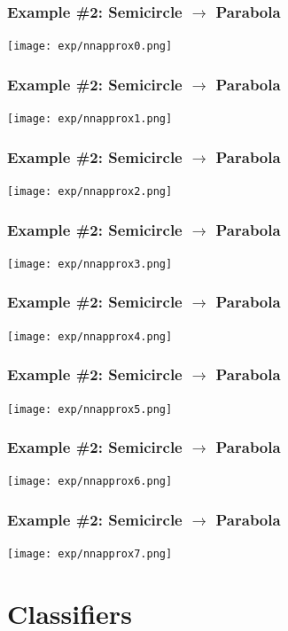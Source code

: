 \documentclass{beamer}
\begin{document}
\begin{frame}
  \frametitle{Example \#2: Semicircle $\rightarrow$ Parabola}

  \texttt{[image: exp/nnapprox0.png]}
\end{frame}

\begin{frame}
  \frametitle{Example \#2: Semicircle $\rightarrow$ Parabola}

  \texttt{[image: exp/nnapprox1.png]}
\end{frame}

\begin{frame}
  \frametitle{Example \#2: Semicircle $\rightarrow$ Parabola}

  \texttt{[image: exp/nnapprox2.png]}
\end{frame}

\begin{frame}
  \frametitle{Example \#2: Semicircle $\rightarrow$ Parabola}

  \texttt{[image: exp/nnapprox3.png]}
\end{frame}

\begin{frame}
  \frametitle{Example \#2: Semicircle $\rightarrow$ Parabola}

  \texttt{[image: exp/nnapprox4.png]}
\end{frame}

\begin{frame}
  \frametitle{Example \#2: Semicircle $\rightarrow$ Parabola}

  \texttt{[image: exp/nnapprox5.png]}
\end{frame}

\begin{frame}
  \frametitle{Example \#2: Semicircle $\rightarrow$ Parabola}

  \texttt{[image: exp/nnapprox6.png]}
\end{frame}

\begin{frame}
  \frametitle{Example \#2: Semicircle $\rightarrow$ Parabola}

  \texttt{[image: exp/nnapprox7.png]}
\end{frame}

\section[Classifiers]{Classifiers}
\setcounter{subsection}{1}
\end{document}
